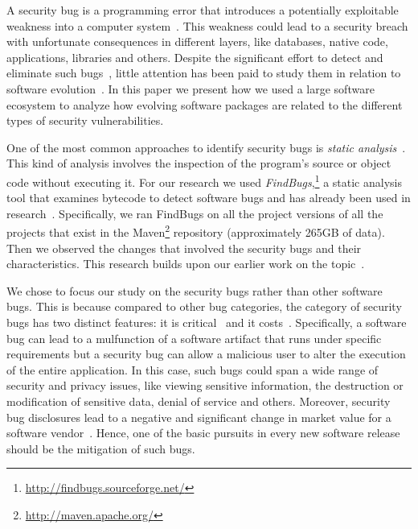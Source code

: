 \documentclass[conference]{IEEEtran}
\begin{document}
A security bug is a programming error that introduces a potentially
exploitable weakness into a computer system~\cite{SSL12, TJBD11}. This weakness could lead to a
security breach with unfortunate consequences in different layers, like databases,
native code, applications, libraries and others. Despite the significant
effort to detect and eliminate such bugs~\cite{SZ12}, little attention has been paid to
study them in relation to software evolution~\cite{L96, LRWPT97, IB06, RGMA06}.
In this paper we present how we used a large software ecosystem to analyze
how evolving software packages are related to the different types of security
vulnerabilities.

One of the most common approaches to identify security bugs is
{\it static analysis}~\cite{CW07}. This kind of analysis involves the
inspection of the program's source or object code without executing
it. For our research we used {\it FindBugs},\footnote{\url{http://findbugs.sourceforge.net/}}
a static analysis tool that examines bytecode to detect software bugs and has already been used in
research~\cite{AP10, HP07, HP04, HW08}. Specifically, we ran FindBugs on all the project
versions of all the projects that exist in the Maven\footnote{\url{http://maven.apache.org/}}
repository (approximately 265GB of data). Then we observed the changes that
involved the security bugs and their characteristics. This research builds upon
our earlier work on the topic~\cite{MGS12}.

We chose to focus our study on the security bugs rather than other
software bugs. This is because compared to other bug categories,
the category of security bugs has two distinct features: it is critical~\cite{SZ12}
and it costs~\cite{BCL08}. Specifically, a software bug can
lead to a mulfunction of a software artifact that runs under specific
requirements but a security bug can allow a malicious user to alter the execution
of the entire application. In this case, such bugs could span a wide
range of security and privacy issues, like viewing sensitive information, the destruction or
modification of sensitive data, denial of service and others.
Moreover, security bug disclosures lead to a negative and significant change
in market value for a software vendor~\cite{TW07}.
Hence, one of the basic pursuits in every new software release should
be the mitigation of such bugs.
\end{document}
